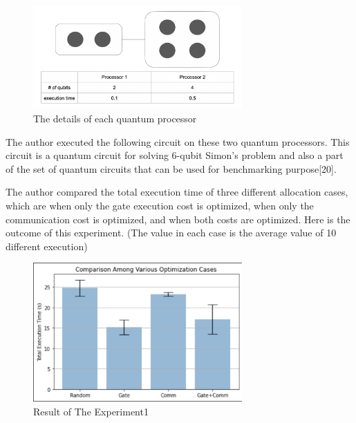  \begin{figure}[h]
  		\begin{center}
  			\includegraphics[width=8cm]{img/first_experiment.png}
			\caption{The details of each quantum processor}
			\label{Fig4}
		\end{center}
	\end{figure}
 
 The author executed the following circuit on these two quantum processors.  This circuit is a quantum circuit for solving 6-qubit Simon's problem and also a part of the set of quantum circuits that can be used for benchmarking purpose[20]. 
 \newline
 \newline
  \newline
 \newline
 The author compared the total execution time of three different allocation cases, which are when only the gate execution cost is optimized, when only the communication cost is optimized, and when both costs are optimized.  Here is the outcome of this experiment.  (The value in each case is the average value of 10 different execution)
 \newpage
  \begin{figure}[h]
  		\begin{center}
  			\includegraphics[width=8cm]{img/first_experiment_plot.png}
			\caption{Result of The Experiment1}
			\label{Fig4}
		\end{center}
	\end{figure}
 
